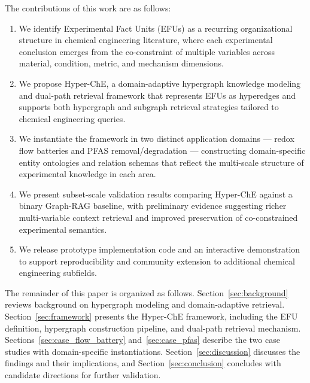 The contributions of this work are as follows:
\begin{enumerate}
  \item We identify Experimental Fact Units (EFUs) as a recurring organizational structure in chemical engineering literature, where each experimental conclusion emerges from the co-constraint of multiple variables across material, condition, metric, and mechanism dimensions.
  \item We propose Hyper-ChE, a domain-adaptive hypergraph knowledge modeling and dual-path retrieval framework that represents EFUs as hyperedges and supports both hypergraph and subgraph retrieval strategies tailored to chemical engineering queries.
  \item We instantiate the framework in two distinct application domains --- redox flow batteries and PFAS removal/degradation --- constructing domain-specific entity ontologies and relation schemas that reflect the multi-scale structure of experimental knowledge in each area.
  \item We present subset-scale validation results comparing Hyper-ChE against a binary Graph-RAG baseline, with preliminary evidence suggesting richer multi-variable context retrieval and improved preservation of co-constrained experimental semantics.
  \item We release prototype implementation code and an interactive demonstration to support reproducibility and community extension to additional chemical engineering subfields.
\end{enumerate}

The remainder of this paper is organized as follows. Section~\ref{sec:background} reviews background on hypergraph modeling and domain-adaptive retrieval. Section~\ref{sec:framework} presents the Hyper-ChE framework, including the EFU definition, hypergraph construction pipeline, and dual-path retrieval mechanism. Sections~\ref{sec:case_flow_battery} and~\ref{sec:case_pfas} describe the two case studies with domain-specific instantiations. Section~\ref{sec:discussion} discusses the findings and their implications, and Section~\ref{sec:conclusion} concludes with candidate directions for further validation.
